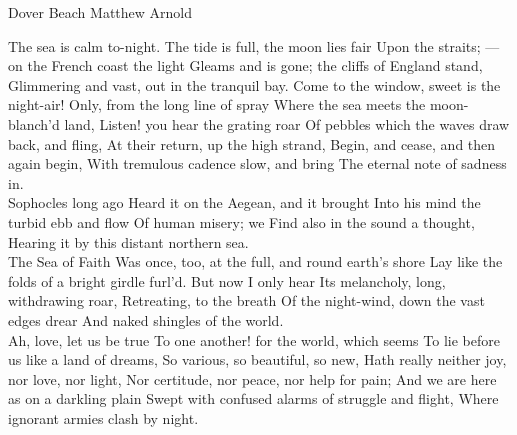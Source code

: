 
\begin{poem}
{Dover Beach} 
{Matthew Arnold}

The sea is calm to-night.                                       
The tide is full, the moon lies fair				
Upon the straits; --- on the French coast the light		
Gleams and is gone; the cliffs of England stand,		
Glimmering and vast, out in the tranquil bay.			
Come to the window, sweet is the night-air!			
Only, from the long line of spray				
Where the sea meets the moon-blanch'd land,			
Listen! you hear the grating roar				
Of pebbles which the waves draw back, and fling,		
At their return, up the high strand,				
Begin, and cease, and then again begin,				
With tremulous cadence slow, and bring				
The eternal note of sadness in.\\

Sophocles long ago						
Heard it on the Aegean, and it brought				
Into his mind the turbid ebb and flow				
Of human misery; we						
Find also in the sound a thought,				
Hearing it by this distant northern sea.\\

The Sea of Faith						
Was once, too, at the full, and round earth's shore		
Lay like the folds of a bright girdle furl'd.			
But now I only hear						
Its melancholy, long, withdrawing roar,				
Retreating, to the breath					
Of the night-wind, down the vast edges drear			
And naked shingles of the world.\\
							
Ah, love, let us be true					
To one another! for the world, which seems			
To lie before us like a land of dreams,				
So various, so beautiful, so new,				
Hath really neither joy, nor love, nor light,			
Nor certitude, nor peace, nor help for pain;			
And we are here as on a darkling plain				
Swept with confused alarms of struggle and flight,		
Where ignorant armies clash by night.
\end{poem}

















